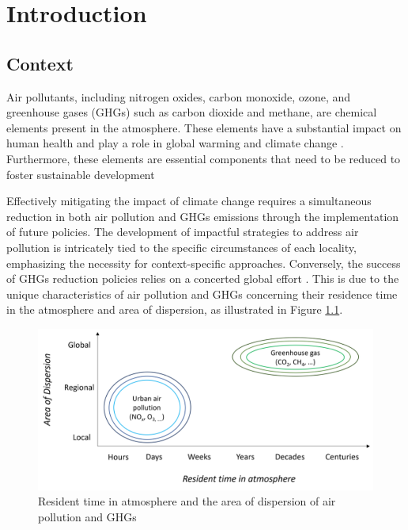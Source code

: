\chapter{Introduction} \label{chap1}
\renewcommand{\headrulewidth}{0pt}
\lhead[\thepage]{\leftmark}
\rhead[\leftmark]{\thepage}
\cfoot[]{}

 \section{Context}

 Air pollutants, including nitrogen oxides, carbon monoxide, ozone, and greenhouse gases (GHGs) such as carbon dioxide and methane, are chemical elements present in the atmosphere. These elements have a substantial impact on human health \citep{kampa2008human} and play a role in global warming and climate change \citep{haines2006climate}. Furthermore, these elements are essential components that need to be reduced to foster sustainable development \par

Effectively mitigating the impact of climate change requires a simultaneous reduction in both air pollution and GHGs emissions through the implementation of future policies. The development of impactful strategies to address air pollution is intricately tied to the specific circumstances of each locality, emphasizing the necessity for context-specific approaches. Conversely, the success of GHGs reduction policies relies on a concerted global effort \citep{keohane2011regime}. This is due to the unique characteristics of air pollution and GHGs concerning their residence time in the atmosphere and area of dispersion, as illustrated in Figure \ref{fig:chap1_fig1}.\par

\begin{figure}[tbh!]
    \centering
    \includegraphics[width=\textwidth]{figs/chap1/residenttime.png}
    \caption[Resident time in atmosphere and the area of dispersion]{Resident time in atmosphere and the area of dispersion of air pollution and GHGs}
    \label{fig:chap1_fig1}
\end{figure}

